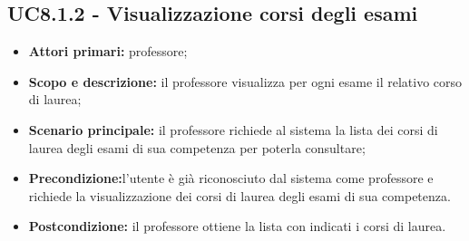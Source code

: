\documentclass[AnalisiDeiRequisiti.tex]{subfiles}
\begin{document}
\subsection{UC8.1.2 - Visualizzazione corsi degli esami}
\begin{itemize}
	\item \textbf{Attori primari:} professore;
	\item \textbf{Scopo e descrizione:} il professore visualizza per ogni esame il relativo corso di laurea;
	\item \textbf{Scenario principale:} il professore richiede al sistema la lista dei corsi di laurea degli esami di sua competenza per poterla consultare;
	\item \textbf{Precondizione:}l'utente è già riconosciuto dal sistema come professore e richiede la visualizzazione dei corsi di laurea degli esami di sua competenza.
	\item \textbf{Postcondizione:} il professore ottiene la lista con indicati i corsi di laurea.
\end{itemize}
\end{document}
